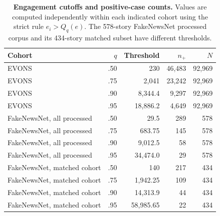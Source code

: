 \begin{table}[!ht]
\centering
\caption{{\bf Engagement cutoffs and positive-case counts.} Values are computed independently within each indicated cohort using the strict rule $e_i>Q_q(e)$. The 578-story FakeNewsNet processed corpus and its 434-story matched subset have different thresholds.}
\label{tab:thresholds}
\small
\begin{tabular}{lrrrr}
\toprule
Cohort & $q$ & Threshold & $n_{+}$ & $N$ \\
\midrule
EVONS & .50 & 230 & 46,483 & 92,969 \\
EVONS & .75 & 2,041 & 23,242 & 92,969 \\
EVONS & .90 & 8,344.4 & 9,297 & 92,969 \\
EVONS & .95 & 18,886.2 & 4,649 & 92,969 \\
\midrule
FakeNewsNet, all processed & .50 & 29.5 & 289 & 578 \\
FakeNewsNet, all processed & .75 & 683.75 & 145 & 578 \\
FakeNewsNet, all processed & .90 & 9,012.5 & 58 & 578 \\
FakeNewsNet, all processed & .95 & 34,474.0 & 29 & 578 \\
\midrule
FakeNewsNet, matched cohort & .50 & 140 & 217 & 434 \\
FakeNewsNet, matched cohort & .75 & 1,942.25 & 109 & 434 \\
FakeNewsNet, matched cohort & .90 & 14,313.9 & 44 & 434 \\
FakeNewsNet, matched cohort & .95 & 58,985.65 & 22 & 434 \\
\bottomrule
\end{tabular}
\end{table}
